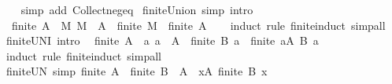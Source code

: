 \begin{isabellebody}
%
\isadelimproof
\ \ %
\endisadelimproof
%
\isatagproof
{}\isamarkupfalse%
\ {\isacharparenleft}{\kern0pt}simp\ add{\isacharcolon}{\kern0pt}\ Collect{\isacharunderscore}{\kern0pt}neg{\isacharunderscore}{\kern0pt}eq{\isacharparenright}{\kern0pt}%
\endisatagproof
{\isafoldproof}%
%
\isadelimproof
\isanewline
%
\endisadelimproof
\isanewline
{}\isamarkupfalse%
\ finite{\isacharunderscore}{\kern0pt}Union\ {\isacharbrackleft}{\kern0pt}simp{\isacharcomma}{\kern0pt}\ intro{\isacharbrackright}{\kern0pt}{\isacharcolon}{\kern0pt}\isanewline
\ \ {\isachardoublequoteopen}finite\ A\ {\isasymLongrightarrow}\ {\isacharparenleft}{\kern0pt}{\isasymAnd}M{\isachardot}{\kern0pt}\ M\ {\isasymin}\ A\ {\isasymLongrightarrow}\ finite\ M{\isacharparenright}{\kern0pt}\ {\isasymLongrightarrow}\ finite\ {\isacharparenleft}{\kern0pt}{\isasymUnion}A{\isacharparenright}{\kern0pt}{\isachardoublequoteclose}\isanewline
%
\isadelimproof
\ \ %
\endisadelimproof
%
\isatagproof
{}\isamarkupfalse%
\ {\isacharparenleft}{\kern0pt}induct\ rule{\isacharcolon}{\kern0pt}\ finite{\isacharunderscore}{\kern0pt}induct{\isacharparenright}{\kern0pt}\ simp{\isacharunderscore}{\kern0pt}all%
\endisatagproof
{\isafoldproof}%
%
\isadelimproof
\isanewline
%
\endisadelimproof
\isanewline
{}\isamarkupfalse%
\ finite{\isacharunderscore}{\kern0pt}UN{\isacharunderscore}{\kern0pt}I\ {\isacharbrackleft}{\kern0pt}intro{\isacharbrackright}{\kern0pt}{\isacharcolon}{\kern0pt}\isanewline
\ \ {\isachardoublequoteopen}finite\ A\ {\isasymLongrightarrow}\ {\isacharparenleft}{\kern0pt}{\isasymAnd}a{\isachardot}{\kern0pt}\ a\ {\isasymin}\ A\ {\isasymLongrightarrow}\ finite\ {\isacharparenleft}{\kern0pt}B\ a{\isacharparenright}{\kern0pt}{\isacharparenright}{\kern0pt}\ {\isasymLongrightarrow}\ finite\ {\isacharparenleft}{\kern0pt}{\isasymUnion}a{\isasymin}A{\isachardot}{\kern0pt}\ B\ a{\isacharparenright}{\kern0pt}{\isachardoublequoteclose}\isanewline
%
\isadelimproof
\ \ %
\endisadelimproof
%
\isatagproof
{}\isamarkupfalse%
\ {\isacharparenleft}{\kern0pt}induct\ rule{\isacharcolon}{\kern0pt}\ finite{\isacharunderscore}{\kern0pt}induct{\isacharparenright}{\kern0pt}\ simp{\isacharunderscore}{\kern0pt}all%
\endisatagproof
{\isafoldproof}%
%
\isadelimproof
\isanewline
%
\endisadelimproof
\isanewline
{}\isamarkupfalse%
\ finite{\isacharunderscore}{\kern0pt}UN\ {\isacharbrackleft}{\kern0pt}simp{\isacharbrackright}{\kern0pt}{\isacharcolon}{\kern0pt}\ {\isachardoublequoteopen}finite\ A\ {\isasymLongrightarrow}\ finite\ {\isacharparenleft}{\kern0pt}{\isasymUnion}{\isacharparenleft}{\kern0pt}B\ {\isacharbackquote}{\kern0pt}\ A{\isacharparenright}{\kern0pt}{\isacharparenright}{\kern0pt}\ {\isasymlongleftrightarrow}\ {\isacharparenleft}{\kern0pt}{\isasymforall}x{\isasymin}A{\isachardot}{\kern0pt}\ finite\ {\isacharparenleft}{\kern0pt}B\ x{\isacharparenright}{\kern0pt}{\isacharparenright}{\kern0pt}{\isachardoublequoteclose}\isanewline

\end{isabellebody}
